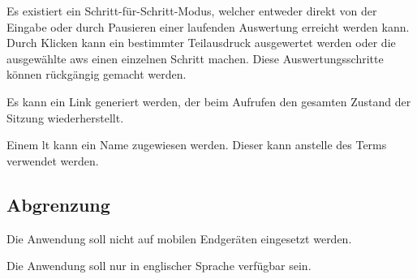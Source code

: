 \documentclass[parskip=full,11pt,twoside]{scrartcl}
\begin{document}
Es existiert ein Schritt-für-Schritt-Modus, welcher entweder direkt von der Eingabe
oder durch Pausieren einer laufenden Auswertung erreicht werden kann.
Durch Klicken kann ein bestimmter Teilausdruck ausgewertet werden oder die ausgewählte
\gls{aws} einen einzelnen Schritt machen. Diese Auswertungsschritte können rückgängig
gemacht werden.

Es kann ein Link generiert werden, der beim Aufrufen den gesamten Zustand
der Sitzung wiederherstellt.

Einem \gls{lt} kann ein Name zugewiesen werden. Dieser kann anstelle des Terms
verwendet werden.


\subsection{Abgrenzung}

Die Anwendung soll nicht auf mobilen Endgeräten eingesetzt werden.

Die Anwendung soll nur in englischer Sprache verfügbar sein.

\pagebreak
\end{document}
